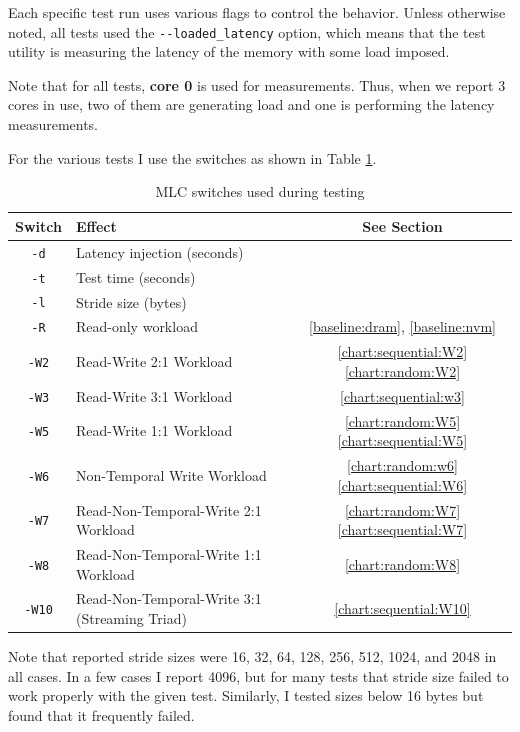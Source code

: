 Each specific test run uses various flags to control the behavior.  Unless
otherwise noted, all tests used the \verb+--loaded_latency+ option, which
means that the test utility is measuring the latency of the memory with
some load imposed.

Note that for all tests, \textbf{core 0} is used for measurements.  Thus, when
we report 3 cores in use, two of them are generating load and one is performing
the latency measurements.

For the various tests I use the switches as shown in Table \ref{mlc:switches}.

\begin{table}
    \caption{MLC switches used during testing}\label{mlc:switches}
    \begin{tabular}{@{}clc@{}}
        Switch & Effect & See Section \\ \toprule
        \verb+-d+ & Latency injection (seconds) &  \\
        \verb+-t+ & Test time (seconds) &  \\
        \verb+-l+ & Stride size (bytes) & \\
        \verb+-R+ & Read-only workload & \ref{baseline:dram}, \ref{baseline:nvm} \\
        \verb+-W2+ & Read-Write 2:1 Workload & \ref{chart:sequential:W2} \ref{chart:random:W2} \\ 
        \verb+-W3+ & Read-Write 3:1 Workload & \ref{chart:sequential:w3} \\
        \verb+-W5+ & Read-Write 1:1 Workload & \ref{chart:random:W5} \ref{chart:sequential:W5} \\
        \verb+-W6+ & Non-Temporal Write Workload & \ref{chart:random:w6} \ref{chart:sequential:W6} \\
        \verb+-W7+ & Read-Non-Temporal-Write 2:1 Workload & \ref{chart:random:W7} \ref{chart:sequential:W7} \\
        \verb+-W8+ & Read-Non-Temporal-Write 1:1 Workload  & \ref{chart:random:W8} \\
        \verb+-W10+ & Read-Non-Temporal-Write 3:1 (Streaming Triad) & \ref{chart:sequential:W10} \\ \bottomrule
    \end{tabular}%
\end{table}

Note that reported stride sizes were 16, 32, 64, 128, 256, 512, 1024, and 2048 in all cases.
In a few cases I report 4096, but for many tests that stride size failed to work properly
with the given test.  Similarly, I tested sizes below 16 bytes but found that it frequently
failed.

